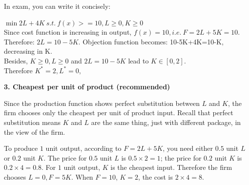 \documentclass{article}
\begin{document}
In exam, you can write it concisely:
\medskip

 $\min 2L + 4K \  s.t. \  f(x) > = 10, L\ge0, K\ge0$ \\
Since cost function is increasing in output, $f(x)=10, i.e. \  F= 2L+5K=10$. Therefore: $2L=10-5K$.  Objection function becomes: 10-5K+4K=10-K, decreasing in K. \\
Besides, $K\ge0,  L\ge0$ and $2L=10-5K$  lead to $K \in [0,2]$. \\
Therefore $K^*=2, L^*=0$, 

\bigskip

\textbf{3. Cheapest per unit of product (recommended)}

Since the production function shows perfect substitution between $L$ and $K$, the firm chooses only the cheapest per unit of product input. Recall that perfect substitution means $K$ and $L$ are the same thing, just with different package, in the view of the firm.

\medskip
To produce $1$ unit output, according to $F = 2L+5K$, you need either $0.5$ unit $L$ or $0.2$ unit $K$. The price for $0.5$ unit $L$ is $0.5 \times 2 =1$; the price for $0.2$ unit $K​$ is $0.2 \times 4 =0.8$.
For $1$ unit output, $K$ is the cheapest input. Therefore the firm chooses $L=0, F=5K$. When $F=10$, $K=2$, the cost is $2 \times 4 =8$.
\end{document}
